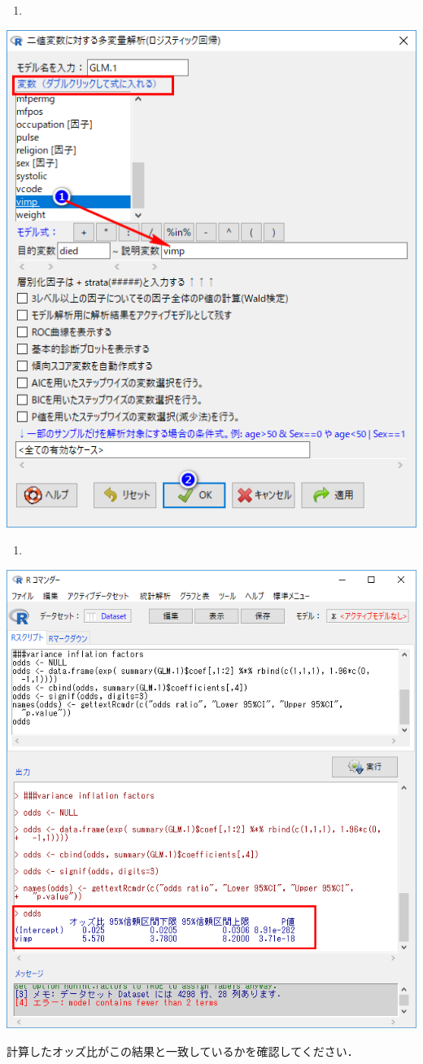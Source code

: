 \documentclass[]{problemset}
\begin{document}
\begin{enumerate}
\def\labelenumi{\arabic{enumi}.}
\setcounter{enumi}{7}
\item
\end{enumerate}

\begin{center}\includegraphics[width=0.5\linewidth]{pic/logstic07} \end{center}

\newpage
\vfill

\begin{enumerate}
\def\labelenumi{\arabic{enumi}.}
\setcounter{enumi}{8}
\item
\end{enumerate}

\begin{center}\includegraphics[width=0.55\linewidth]{pic/logstic08} \end{center}

計算したオッズ比がこの結果と一致しているかを確認してください．
\end{document}
